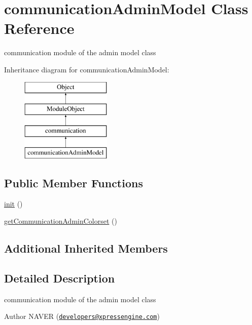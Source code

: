 \hypertarget{classcommunicationAdminModel}{\section{communication\-Admin\-Model Class Reference}
\label{classcommunicationAdminModel}
}


communication module of the admin model class  


Inheritance diagram for communication\-Admin\-Model\-:\begin{figure}[H]
\begin{center}
\leavevmode
\includegraphics[height=4.000000cm]{classcommunicationAdminModel}
\end{center}
\end{figure}
\subsection*{Public Member Functions}
\begin{DoxyCompactItemize}
\item 
\hyperlink{classcommunicationAdminModel_a4e1331e1b2ae7131c7466d3eaf1f86f0}{init} ()
\item 
\hyperlink{classcommunicationAdminModel_ade2f9d20f5902304d38999095261c827}{get\-Communication\-Admin\-Colorset} ()
\end{DoxyCompactItemize}
\subsection*{Additional Inherited Members}


\subsection{Detailed Description}
communication module of the admin model class 

\begin{DoxyAuthor}{Author}
N\-A\-V\-E\-R (\href{mailto:developers@xpressengine.com}{\tt developers@xpressengine.\-com}) 
\end{DoxyAuthor}



